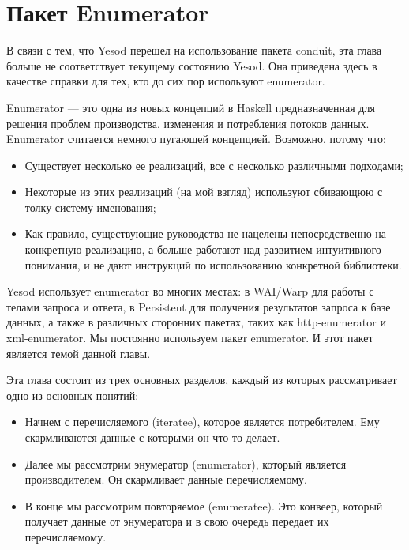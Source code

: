 \chapter{Пакет Enumerator}\label{chap:enumerator}

\begin{remark}
В связи с тем, что Yesod перешел на использование пакета conduit, эта глава больше не соответствует текущему состоянию Yesod. Она приведена здесь в качестве справки для тех, кто до сих пор используют enumerator.
\end{remark}

Enumerator --- это одна из новых концепций в Haskell предназначенная для решения проблем производства, изменения и потребления потоков данных. Enumerator считается немного пугающей концепцией. Возможно, потому что:

\begin{itemize}
\item Существует несколько ее реализаций, все с несколько различными подходами;
\item Некоторые из этих реализаций (на мой взгляд) используют сбивающюю с толку систему именования;
\item Как правило, существующие руководства не нацелены непосредственно на конкретную реализацию, а больше работают над развитием интуитивного понимания, и не дают инструкций по использованию конкретной библиотеки.
\end{itemize}

Yesod использует enumerator во многих местах: в WAI/Warp для работы с телами запроса и ответа, в Persistent для получения результатов запроса к базе данных, а также в различных сторонних пакетах, таких как http-enumerator и xml-enumerator. Мы постоянно используем пакет enumerator. И этот пакет является темой данной главы.

Эта глава состоит из трех основных разделов, каждый из которых рассматривает одно из основных понятий:

\begin{itemize}
\item Начнем с перечисляемого (iteratee), которое является потребителем. Ему скармливаются данные с которыми он что-то делает.
\item Далее мы рассмотрим энумератор (enumerator), который является производителем. Он скармливает данные перечисляемому.
\item В конце мы рассмотрим повторяемое (enumeratee). Это конвеер, который получает данные от энумератора и в свою очередь передает их перечисляемому.
\end{itemize}

